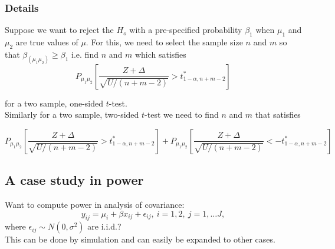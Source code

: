\documentclass[12pt,a4paper]{article}
\theoremstyle{regla}
\theoremstyle{remark}
\theoremstyle{definition}
\theoremstyle{nonumberbreak}
\begin{document}
\subsubsection{Details}
Suppose we want to reject the $H_o$ with a pre-specified probability $\beta_1$ when $\mu_1$ and $\mu_2$ are true values of $\mu$. For this, we need to select the sample size $n$ and $m$ so that $\beta_{(\mu_1\mu_2)} \geq \beta_1$ i.e. find $n$ and $m$ which satisfies 
$$ P_{\mu_1\mu_2} \left[ \frac{Z + \Delta}{\sqrt{U/(n+m-2)}} > t^\ast_{1-\alpha,n+m-2} \right] $$

 
for a two sample, one-sided $t$-test. \\

Similarly for a two sample, two-sided $t$-test we need to find $n$ and $m$ that satisfies 

$$P_{\mu_1\mu_2}\left[ \frac{Z + \Delta}{\sqrt{U/(n+m-2)}} > t^\ast_{1-\alpha,n+m-2} \right] +
P_{\mu_1\mu_2} \left[\frac{Z + \Delta}{\sqrt{U/(n+m-2)}} < -t^\ast_{1-\alpha,n+m-2} \right]$$



\subsection{A case study in power}
\begin{fbox}
\begin{minipage}{0.97\textwidth}
Want to compute power in analysis of covariance:
$$
y_{ij}=\mu_i+\beta x_{ij}+\epsilon_{ij} , \ i=1, 2,\ j=1,\ldots J,
$$
where $\epsilon_{ij}\sim N(0,\sigma^ 2)$ are i.i.d.?\\

This can be done by simulation and can easily be expanded to other cases.


\end{minipage}
\end{fbox}
\end{document}
